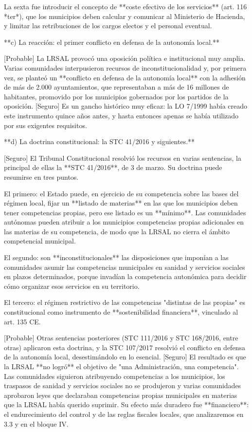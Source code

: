 \documentclass[10pt,a4paper]{article}
\begin{document}
La sexta fue introducir el concepto de **coste efectivo de los servicios** (art. 116 *ter*), que los municipios deben calcular y comunicar al Ministerio de Hacienda, y limitar las retribuciones de los cargos electos y el personal eventual.

**c) La reacción: el primer conflicto en defensa de la autonomía local.**

[Probable] La LRSAL provocó una oposición política e institucional muy amplia. Varias comunidades interpusieron recursos de inconstitucionalidad y, por primera vez, se planteó un **conflicto en defensa de la autonomía local** con la adhesión de más de 2.000 ayuntamientos, que representaban a más de 16 millones de habitantes, promovido por los municipios gobernados por los partidos de la oposición. [Seguro] Es un gancho histórico muy eficaz: la LO 7/1999 había creado este instrumento quince años antes, y hasta entonces apenas se había utilizado por sus exigentes requisitos.

**d) La doctrina constitucional: la STC 41/2016 y siguientes.**

[Seguro] El Tribunal Constitucional resolvió los recursos en varias sentencias, la principal de ellas la **STC 41/2016**, de 3 de marzo. Su doctrina puede resumirse en tres puntos.

El primero: el Estado puede, en ejercicio de su competencia sobre las bases del régimen local, fijar un **listado de materias** en las que los municipios deben tener competencias propias, pero ese listado es un **mínimo**. Las comunidades autónomas pueden atribuir a los municipios competencias propias adicionales en las materias de su competencia, de modo que la LRSAL no cierra el ámbito competencial municipal.

El segundo: son **inconstitucionales** las disposiciones que imponían a las comunidades asumir las competencias municipales en sanidad y servicios sociales en plazos determinados, porque invadían la competencia autonómica para decidir cómo organizar esos servicios en su territorio.

El tercero: el régimen restrictivo de las competencias "distintas de las propias" es constitucional como instrumento de **sostenibilidad financiera**, vinculado al art. 135 CE.

[Probable] Otras sentencias posteriores (STC 111/2016 y STC 168/2016, entre otras) aplicaron esta doctrina, y la STC 107/2017 resolvió el conflicto en defensa de la autonomía local, desestimándolo en lo esencial. [Seguro] El resultado es que la LRSAL **no logró** el objetivo de "una Administración, una competencia". Las comunidades siguieron atribuyendo competencias a los municipios, los traspasos de sanidad y servicios sociales no se produjeron y varias comunidades aprobaron leyes que declaraban competencias propias municipales en materias que la LRSAL había querido suprimir. Su efecto más duradero fue **financiero**: el endurecimiento del control y de las reglas fiscales locales, que analizaremos en 3.3 y en el bloque IV.
\end{document}
